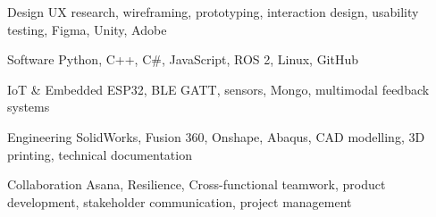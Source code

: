 
\cvitem
{Design}
{UX research, wireframing, prototyping, interaction design, usability testing, Figma, Unity, Adobe}


\cvitem
{Software}
{Python, C++, C\#, JavaScript, ROS 2, Linux, GitHub}


\cvitem
{IoT \& Embedded}
{ESP32, BLE GATT, sensors, Mongo, multimodal feedback systems}


\cvitem
{Engineering}
{SolidWorks, Fusion 360, Onshape, Abaqus, CAD modelling, 3D printing, technical documentation}


\cvitem
{Collaboration}
{Asana, Resilience, Cross-functional teamwork, product development, stakeholder communication, project management}